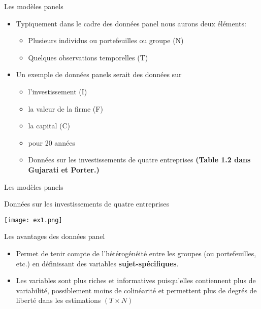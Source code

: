\documentclass{beamer}
\begin{document}
\begin{frame}{Les modèles panels}
\begin{itemize}
\item Typiquement dans le cadre des données panel nous aurons deux éléments:
\begin{itemize}
\item Plusieurs individus ou portefeuilles ou groupe (N)
\item Quelques observations temporelles (T)
\end{itemize}
\item Un exemple de données panels serait des données sur
\begin{itemize}
\item l’investissement (I)
\item la valeur de la firme (F) 
\item la capital (C)
\item pour 20 années
\item Données sur les investissements de quatre entreprises \textbf{(Table 1.2 dans Gujarati et Porter.)}
\end{itemize}
\end{itemize}
\end{frame}


\begin{frame}{Les modèles panels}
\begin{block}{Données sur les investissements de quatre entreprises}
\begin{center}
\texttt{[image: ex1.png]}
\end{center}
\end{block}
\end{frame}

\begin{frame}{Les avantages des données panel}
\begin{itemize}
\item Permet de tenir compte de l’hétérogénéité entre les groupes (ou portefeuilles, etc.) en définissant des variables \textbf{sujet-spécifiques}.
\item Les variables sont plus riches et informatives puisqu’elles contiennent plus de variabilité, possiblement moins de colinéarité et permettent plus de degrés de liberté dans les estimations $(T \times N)$


\end{itemize}
\end{frame}
\end{document}
